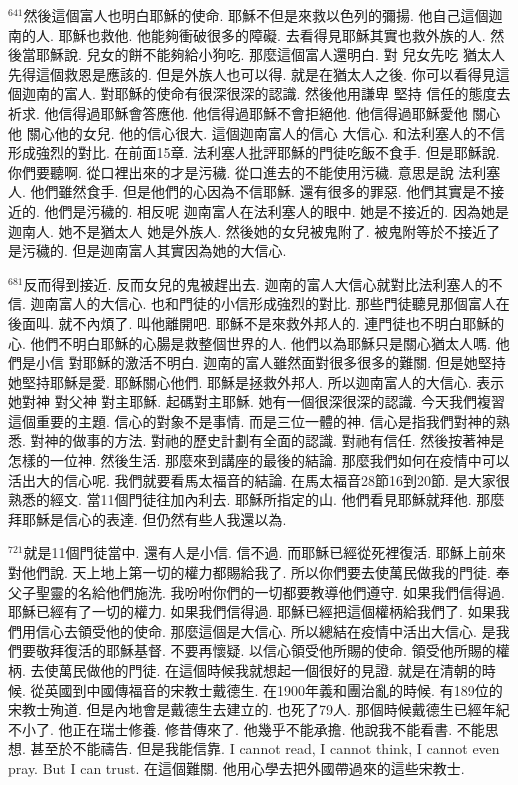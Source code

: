 \documentclass{book}
\begin{document}
$^{641}$然後這個富人也明白耶穌的使命.
耶穌不但是來救以色列的彌揚.
他自己這個迦南的人.
耶穌也救他.
他能夠衝破很多的障礙.
去看得見耶穌其實也救外族的人.
然後當耶穌說.
兒女的餅不能夠給小狗吃.
那麼這個富人還明白.
對 兒女先吃 猶太人先得這個救恩是應該的.
但是外族人也可以得.
就是在猶太人之後.
你可以看得見這個迦南的富人.
對耶穌的使命有很深很深的認識.
然後他用謙卑 堅持 信任的態度去祈求.
他信得過耶穌會答應他.
他信得過耶穌不會拒絕他.
他信得過耶穌愛他 關心他 關心他的女兒.
他的信心很大.
這個迦南富人的信心 大信心.
和法利塞人的不信形成強烈的對比.
在前面15章.
法利塞人批評耶穌的門徒吃飯不食手.
但是耶穌說.
你們要聽啊.
從口裡出來的才是污穢.
從口進去的不能使用污穢.
意思是說 法利塞人.
他們雖然食手.
但是他們的心因為不信耶穌.
還有很多的罪惡.
他們其實是不接近的.
他們是污穢的.
相反呢 迦南富人在法利塞人的眼中.
她是不接近的.
因為她是迦南人.
她不是猶太人 她是外族人.
然後她的女兒被鬼附了.
被鬼附等於不接近了 是污穢的.
但是迦南富人其實因為她的大信心.

$^{681}$反而得到接近.
反而女兒的鬼被趕出去.
迦南的富人大信心就對比法利塞人的不信.
迦南富人的大信心.
也和門徒的小信形成強烈的對比.
那些門徒聽見那個富人在後面叫.
就不內煩了.
叫他離開吧.
耶穌不是來救外邦人的.
連門徒也不明白耶穌的心.
他們不明白耶穌的心腸是救整個世界的人.
他們以為耶穌只是關心猶太人嗎.
他們是小信 對耶穌的激活不明白.
迦南的富人雖然面對很多很多的難關.
但是她堅持 她堅持耶穌是愛.
耶穌關心他們.
耶穌是拯救外邦人.
所以迦南富人的大信心.
表示她對神 對父神 對主耶穌.
起碼對主耶穌.
她有一個很深很深的認識.
今天我們複習這個重要的主題.
信心的對象不是事情.
而是三位一體的神.
信心是指我們對神的熟悉.
對神的做事的方法.
對祂的歷史計劃有全面的認識.
對祂有信任.
然後按著神是怎樣的一位神.
然後生活.
那麼來到講座的最後的結論.
那麼我們如何在疫情中可以活出大的信心呢.
我們就要看馬太福音的結論.
在馬太福音28節16到20節.
是大家很熟悉的經文.
當11個門徒往加內利去.
耶穌所指定的山.
他們看見耶穌就拜他.
那麼拜耶穌是信心的表達.
但仍然有些人我還以為.

$^{721}$就是11個門徒當中.
還有人是小信.
信不過.
而耶穌已經從死裡復活.
耶穌上前來對他們說.
天上地上第一切的權力都賜給我了.
所以你們要去使萬民做我的門徒.
奉父子聖靈的名給他們施洗.
我吩咐你們的一切都要教導他們遵守.
如果我們信得過.
耶穌已經有了一切的權力.
如果我們信得過.
耶穌已經把這個權柄給我們了.
如果我們用信心去領受他的使命.
那麼這個是大信心.
所以總結在疫情中活出大信心.
是我們要敬拜復活的耶穌基督.
不要再懷疑.
以信心領受他所賜的使命.
領受他所賜的權柄.
去使萬民做他的門徒.
在這個時候我就想起一個很好的見證.
就是在清朝的時候.
從英國到中國傳福音的宋教士戴德生.
在1900年義和團治亂的時候.
有189位的宋教士殉道.
但是內地會是戴德生去建立的.
也死了79人.
那個時候戴德生已經年紀不小了.
他正在瑞士修養.
修昔傳來了.
他幾乎不能承擔.
他說我不能看書.
不能思想.
甚至於不能禱告.
但是我能信靠.
I cannot read, I cannot think, I cannot even pray.
But I can trust.
在這個難關.
他用心學去把外國帶過來的這些宋教士.
\end{document}
